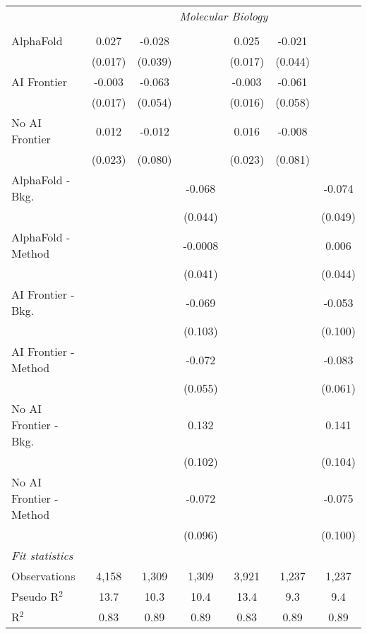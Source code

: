 \begin{tabular}{lcccccc}
 & \multicolumn{6}{c}{\textit{Molecular Biology}} \\ \\
   AlphaFold               & 0.027   & -0.028  &         & 0.025   & -0.021  &   \\   
                           & (0.017) & (0.039) &         & (0.017) & (0.044) &   \\   
   AI Frontier             & -0.003  & -0.063  &         & -0.003  & -0.061  &   \\   
                           & (0.017) & (0.054) &         & (0.016) & (0.058) &   \\   
   No AI Frontier          & 0.012   & -0.012  &         & 0.016   & -0.008  &   \\   
                           & (0.023) & (0.080) &         & (0.023) & (0.081) &   \\   
   AlphaFold - Bkg.        &         &         & -0.068  &         &         & -0.074\\   
                           &         &         & (0.044) &         &         & (0.049)\\   
   AlphaFold - Method      &         &         & -0.0008 &         &         & 0.006\\   
                           &         &         & (0.041) &         &         & (0.044)\\   
   AI Frontier - Bkg.      &         &         & -0.069  &         &         & -0.053\\   
                           &         &         & (0.103) &         &         & (0.100)\\   
   AI Frontier - Method    &         &         & -0.072  &         &         & -0.083\\   
                           &         &         & (0.055) &         &         & (0.061)\\   
   No AI Frontier - Bkg.   &         &         & 0.132   &         &         & 0.141\\   
                           &         &         & (0.102) &         &         & (0.104)\\   
   No AI Frontier - Method &         &         & -0.072  &         &         & -0.075\\   
                           &         &         & (0.096) &         &         & (0.100)\\   
   \midrule
   \emph{Fit statistics}\\
   Observations            & 4,158   & 1,309   & 1,309   & 3,921   & 1,237   & 1,237\\  
   Pseudo R$^2$            & 13.7    & 10.3    & 10.4    & 13.4    & 9.3     & 9.4\\  
   R$^2$                   & 0.83    & 0.89    & 0.89    & 0.83    & 0.89    & 0.89\\  
   

\end{tabular}
